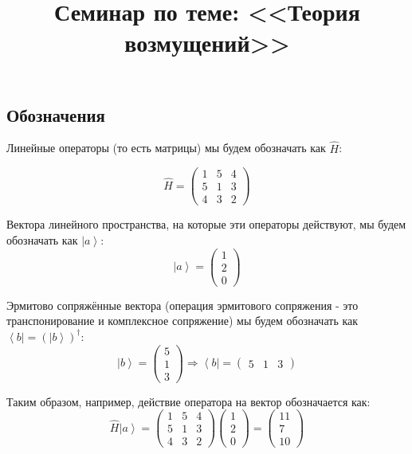 \documentclass[a4paper,12pt]{article}
\begin{document}
\title{Семинар по теме: <<Теория возмущений>>}
\maketitle

\subsection*{Обозначения}

Линейные операторы (то есть матрицы) мы будем обозначать как $\hat{H}$:

\[
\hat{H}=\begin{pmatrix}1 & 5 & 4\\
5 & 1 & 3\\
4 & 3 & 2
\end{pmatrix}
\]

\noindent
Вектора линейного пространства, на которые эти операторы действуют,
мы будем обозначать как $\left|a\right>$:
\[
\left|a\right\rangle =\begin{pmatrix}1\\
2\\
0
\end{pmatrix}
\]


\noindent
Эрмитово сопряжённые вектора (операция эрмитового сопряжения - это
транспонирование и комплексное сопряжение) мы будем обозначать как
$\left<b\right|=(\left|b\right>)^{\dagger}$:
\[
\left|b\right\rangle =\begin{pmatrix}5\\
1\\
3
\end{pmatrix}\Rightarrow\left<b\right|=\begin{pmatrix}5 & 1 & 3\end{pmatrix}
\]


\noindent
Таким образом, например, действие оператора на вектор обозначается
как:
\[
\hat{H}\left|a\right>=\begin{pmatrix}1 & 5 & 4\\
5 & 1 & 3\\
4 & 3 & 2
\end{pmatrix}\begin{pmatrix}1\\
2\\
0
\end{pmatrix}=\begin{pmatrix}11\\
7\\
10
\end{pmatrix}
\]
\end{document}
